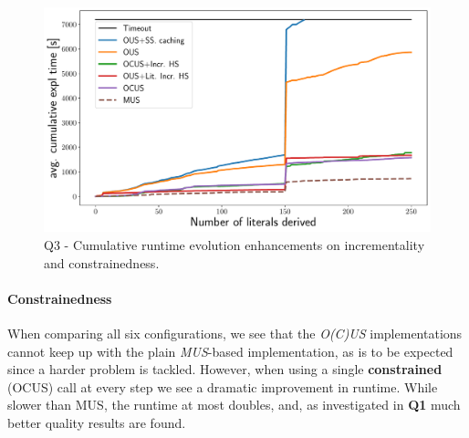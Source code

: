 \begin{figure}[t]
	\centering
	\includegraphics[width=\columnwidth]{figures_post_paper/cumul_incr_avg_time_lits_derived.pdf}
	\caption{Q3 - Cumulative runtime evolution enhancements on incrementality and constrainedness.}
	\label{fig:incrementality_constraindness}
\end{figure}

 \paragraph{Constrainedness}
When comparing all six configurations, we see that the \emph{O(C)US} implementations cannot keep up with the plain \emph{MUS}-based implementation, as is to be expected since a harder problem is tackled.
However, when using a single \textbf{constrained} (OCUS) call at every step we see a dramatic improvement in runtime. 
While slower than MUS, the runtime at most doubles, and, as investigated in \textbf{Q1} much better quality results are found. 




